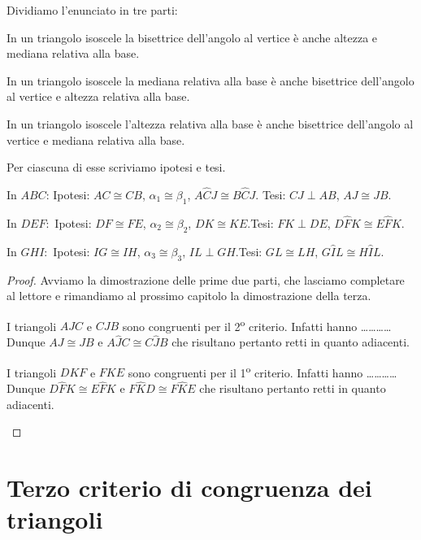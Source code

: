 Dividiamo l'enunciato in tre parti:
\begin{enumeratea}
\item In un triangolo isoscele la bisettrice dell'angolo al vertice è 
anche altezza e mediana relativa alla base.
\item In un triangolo isoscele la mediana relativa alla base è anche 
bisettrice dell'angolo al vertice e altezza relativa alla base.
\item In un triangolo isoscele l'altezza relativa alla base è anche 
bisettrice dell'angolo al vertice e mediana relativa alla base.
\end{enumeratea}

Per ciascuna di esse scriviamo ipotesi e tesi.
\begin{enumeratea}
\item In $ABC$:	Ipotesi: $AC\cong CB$, $\alpha_1\cong \beta_1$, 
$A\widehat{C}J\cong B\widehat{C}J$. Tesi: $CJ\perp AB$, $AJ\cong JB$.
\item In $DEF$:	\,Ipotesi: $DF\cong FE$, $\alpha_2\cong \beta_2$, 
$DK\cong KE$.\tab Tesi: $FK\perp DE$, $D\widehat{F}K\cong 
E\widehat{F}K$.
\item In $GHI$:	\,Ipotesi: $IG\cong IH$, $\alpha_3\cong \beta_3$, 
$IL\perp GH$.\tab Tesi: $GL\cong LH$, $G\widehat{I}L\cong 
H\widehat{I}L$.
\end{enumeratea}

\begin{proof}
Avviamo la dimostrazione delle prime due parti, che lasciamo 
completare al lettore e rimandiamo al prossimo capitolo la 
dimostrazione della terza.

\begin{enumeratea}
\item I triangoli $AJC$ e $CJB$ sono congruenti per il 
2\textsuperscript{o} criterio. Infatti hanno 
\ldots\ldots\ldots\ldots{}\\
Dunque $AJ\cong JB$ e $A\widehat{J}C\cong C\widehat{J}B$ che 
risultano pertanto retti in quanto adiacenti.  
\item I triangoli $DKF$ e $FKE$ sono congruenti per il 
1\textsuperscript{o} criterio. Infatti hanno 
\ldots\ldots\ldots\ldots{}\\
Dunque $D\widehat{F}K\cong E\widehat{F}K$ e $F\widehat{K}D\cong 
F\widehat{K}E$ che risultano pertanto retti in quanto adiacenti.
\end{enumeratea}
\end{proof}

\section{Terzo criterio di congruenza dei 
triangoli}\label{sect:terzo_criterio_congruenza_triangoli}

